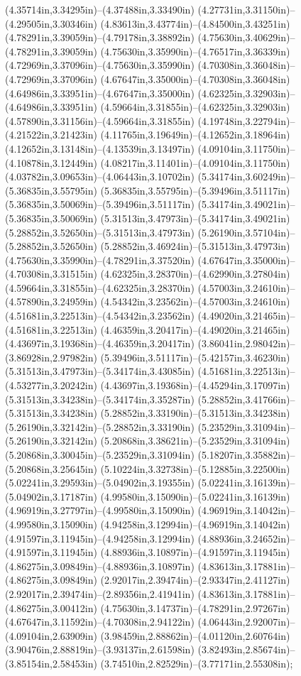 (4.35714in,3.34295in)--(4.37488in,3.33490in) (4.27731in,3.31150in)--(4.29505in,3.30346in) (4.83613in,3.43774in)--(4.84500in,3.43251in) (4.78291in,3.39059in)--(4.79178in,3.38892in) (4.75630in,3.40629in)--(4.78291in,3.39059in) (4.75630in,3.35990in)--(4.76517in,3.36339in) (4.72969in,3.37096in)--(4.75630in,3.35990in) (4.70308in,3.36048in)--(4.72969in,3.37096in) (4.67647in,3.35000in)--(4.70308in,3.36048in) (4.64986in,3.33951in)--(4.67647in,3.35000in) (4.62325in,3.32903in)--(4.64986in,3.33951in) (4.59664in,3.31855in)--(4.62325in,3.32903in) (4.57890in,3.31156in)--(4.59664in,3.31855in) (4.19748in,3.22794in)--(4.21522in,3.21423in) (4.11765in,3.19649in)--(4.12652in,3.18964in) (4.12652in,3.13148in)--(4.13539in,3.13497in) (4.09104in,3.11750in)--(4.10878in,3.12449in) (4.08217in,3.11401in)--(4.09104in,3.11750in) (4.03782in,3.09653in)--(4.06443in,3.10702in) (5.34174in,3.60249in)--(5.36835in,3.55795in) (5.36835in,3.55795in)--(5.39496in,3.51117in) (5.36835in,3.50069in)--(5.39496in,3.51117in) (5.34174in,3.49021in)--(5.36835in,3.50069in) (5.31513in,3.47973in)--(5.34174in,3.49021in) (5.28852in,3.52650in)--(5.31513in,3.47973in) (5.26190in,3.57104in)--(5.28852in,3.52650in) (5.28852in,3.46924in)--(5.31513in,3.47973in) (4.75630in,3.35990in)--(4.78291in,3.37520in) (4.67647in,3.35000in)--(4.70308in,3.31515in) (4.62325in,3.28370in)--(4.62990in,3.27804in) (4.59664in,3.31855in)--(4.62325in,3.28370in) (4.57003in,3.24610in)--(4.57890in,3.24959in) (4.54342in,3.23562in)--(4.57003in,3.24610in) (4.51681in,3.22513in)--(4.54342in,3.23562in) (4.49020in,3.21465in)--(4.51681in,3.22513in) (4.46359in,3.20417in)--(4.49020in,3.21465in) (4.43697in,3.19368in)--(4.46359in,3.20417in) (3.86041in,2.98042in)--(3.86928in,2.97982in) (5.39496in,3.51117in)--(5.42157in,3.46230in) (5.31513in,3.47973in)--(5.34174in,3.43085in) (4.51681in,3.22513in)--(4.53277in,3.20242in) (4.43697in,3.19368in)--(4.45294in,3.17097in) (5.31513in,3.34238in)--(5.34174in,3.35287in) (5.28852in,3.41766in)--(5.31513in,3.34238in) (5.28852in,3.33190in)--(5.31513in,3.34238in) (5.26190in,3.32142in)--(5.28852in,3.33190in) (5.23529in,3.31094in)--(5.26190in,3.32142in) (5.20868in,3.38621in)--(5.23529in,3.31094in) (5.20868in,3.30045in)--(5.23529in,3.31094in) (5.18207in,3.35882in)--(5.20868in,3.25645in) (5.10224in,3.32738in)--(5.12885in,3.22500in) (5.02241in,3.29593in)--(5.04902in,3.19355in) (5.02241in,3.16139in)--(5.04902in,3.17187in) (4.99580in,3.15090in)--(5.02241in,3.16139in) (4.96919in,3.27797in)--(4.99580in,3.15090in) (4.96919in,3.14042in)--(4.99580in,3.15090in) (4.94258in,3.12994in)--(4.96919in,3.14042in) (4.91597in,3.11945in)--(4.94258in,3.12994in) (4.88936in,3.24652in)--(4.91597in,3.11945in) (4.88936in,3.10897in)--(4.91597in,3.11945in) (4.86275in,3.09849in)--(4.88936in,3.10897in) (4.83613in,3.17881in)--(4.86275in,3.09849in) (2.92017in,2.39474in)--(2.93347in,2.41127in) (2.92017in,2.39474in)--(2.89356in,2.41941in) (4.83613in,3.17881in)--(4.86275in,3.00412in) (4.75630in,3.14737in)--(4.78291in,2.97267in) (4.67647in,3.11592in)--(4.70308in,2.94122in) (4.06443in,2.92007in)--(4.09104in,2.63909in) (3.98459in,2.88862in)--(4.01120in,2.60764in) (3.90476in,2.88819in)--(3.93137in,2.61598in) (3.82493in,2.85674in)--(3.85154in,2.58453in) (3.74510in,2.82529in)--(3.77171in,2.55308in);
